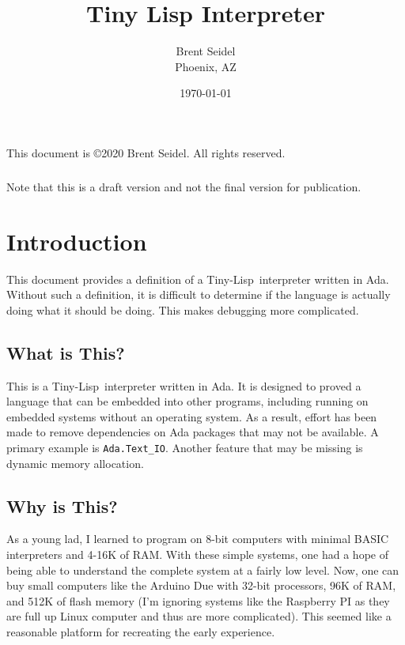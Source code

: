 \documentclass[10pt, openany]{book}
\title{Tiny Lisp Interpreter}
\author{Brent Seidel \\ Phoenix, AZ}
\date{ \today }
\newcommand{\package}[1]{\texttt{#1}}
\newcommand{\tl}{Tiny-Lisp}
\begin{document}
%
%
\frontmatter
\maketitle
\begin{center}
This document is \copyright 2020 Brent Seidel.  All rights reserved.

\paragraph{}Note that this is a draft version and not the final version for publication.
\end{center}
\tableofcontents

\mainmatter
\chapter{Introduction}
This document provides a definition of a \tl\ interpreter written in Ada.  Without such a definition, it is difficult to determine if the language is actually doing what it should be doing.  This makes debugging more complicated.

\section{What is This?}
This is a \tl\ interpreter written in Ada.  It is designed to proved a language that can be embedded into other programs, including running on embedded systems without an operating system.  As a result, effort has been made to remove dependencies on Ada packages that may not be available.  A primary example is \package{Ada.Text\_IO}.  Another feature that may be missing is dynamic memory allocation.

\section{Why is This?}
As a young lad, I learned to program on 8-bit computers with minimal BASIC interpreters and 4-16K of RAM.  With these simple systems, one had a hope of being able to understand the complete system at a fairly low level.  Now, one can buy small computers like the Arduino Due with 32-bit processors, 96K of RAM, and 512K of flash memory (I'm ignoring systems like the Raspberry PI as they are full up Linux computer and thus are more complicated).  This seemed like a reasonable platform for recreating the early experience.
\end{document}
